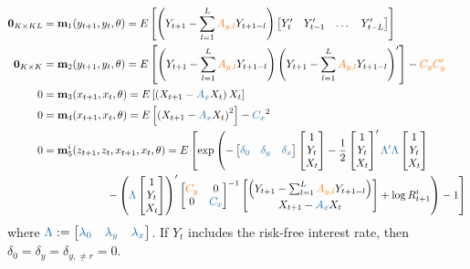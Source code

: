 \documentclass[11pt, letterpaper, notitlepage]{article}
\begin{document}
\begin{align*}
\mathbf{0}_{K\times KL} &= \mathbf{m}_{1}(y_{t+1}, y_t, \theta) = E\left[\left(Y_{t+1} - \sum_{l=1}^{L}\textcolor{orange}{A_{y, l}} Y_{t+1-l}\right)\begin{bmatrix}
Y'_t & Y'_{t-1} & \dots & Y'_{t-L}
\end{bmatrix}\right] \\
\mathbf{0}_{K\times K} &= \mathbf{m}_{2}(y_{t+1}, y_t, \theta) = E\left[\left(Y_{t+1} - \sum_{l=1}^{L}\textcolor{orange}{A_{y, l}} Y_{t+1-l}\right)\left(Y_{t+1} - \sum_{l=1}^{L}\textcolor{orange}{A_{y, l}} Y_{t+1-l}\right)'\right] - \textcolor{orange}{C_yC_y'}\\
0 &= \mathbf{m}_{3}(x_{t+1}, x_t, \theta) = E\left[\left(X_{t+1} - \textcolor{blue}{A_{x}} X_{t}\right)X_t\right] \\
0 &= \mathbf{m}_{4}(x_{t+1}, x_t, \theta) = E\left[\left(X_{t+1} - \textcolor{blue}{A_{x}} X_{t}\right)^2\right] - \textcolor{blue}{C_x}^2\\
0 &= \mathbf{m}^i_{5}(z_{t+1}, z_t, x_{t+1}, x_t, \theta) = E\left[\exp\left(- \begin{bmatrix} 
\textcolor{blue}{\delta_0} & \textcolor{blue}{\delta_y} & \textcolor{blue}{\delta_x} 
\end{bmatrix} \begin{bmatrix}
1 \\ Y_t \\ X_t
\end{bmatrix} - \frac{1}{2}\begin{bmatrix}
1 \\ Y_t \\ X_t
\end{bmatrix}'\textcolor{blue}{\Lambda'\Lambda}\begin{bmatrix}
1 \\ Y_t \\ X_t
\end{bmatrix} \right.\right.\\ 
&\left.\left.\hspace{2cm}- \left(\textcolor{blue}{\Lambda}\begin{bmatrix}
1 \\ Y_t \\ X_t
\end{bmatrix}\right)'\begin{bmatrix} 
\textcolor{orange}{C_y} & 0\\ 0 & \textcolor{blue}{C_x}
\end{bmatrix}^{-1}\begin{bmatrix}
\left(Y_{t+1} - \sum_{l=1}^{L}\textcolor{orange}{A_{y, l}} Y_{t+1-l}\right)\\
X_{t+1}-\textcolor{blue}{A_x} X_t
\end{bmatrix} + \log R^i_{t+1} \right) - 1 \right]
\end{align*}
where $\textcolor{blue}{\Lambda} := \begin{bmatrix} 
\textcolor{blue}{\lambda_0} & \textcolor{blue}{\lambda_y} & \textcolor{blue}{\lambda_x} 
\end{bmatrix}$. If $Y_t$ includes the risk-free interest rate, then $\delta_0=\delta_y=\delta_{y,\neq r} =0$.
\end{document}
